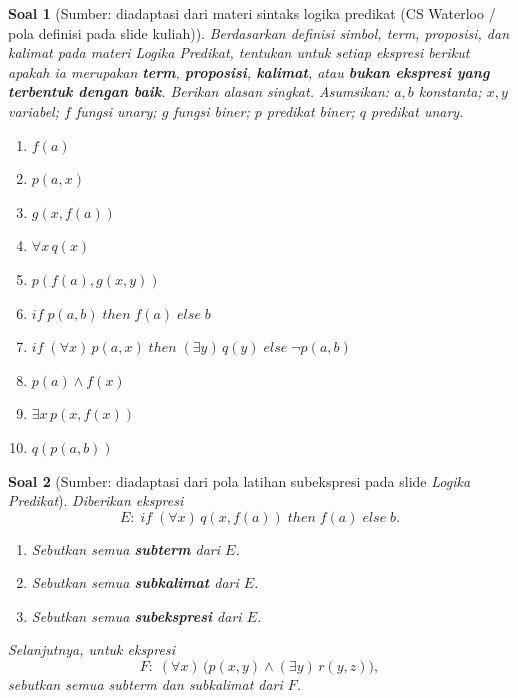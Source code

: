 \documentclass[12pt,a4paper]{article}
\theoremstyle{soaljarak}
\newtheorem{soal}{Soal}
\begin{document}
\begin{soal}[\normalfont Sumber: diadaptasi dari materi sintaks logika predikat (CS Waterloo / pola definisi pada slide kuliah)]
  Berdasarkan definisi simbol, term, proposisi, dan kalimat pada materi \textit{Logika Predikat}, tentukan untuk setiap ekspresi berikut apakah ia merupakan \textbf{term}, \textbf{proposisi}, \textbf{kalimat}, atau \textbf{bukan ekspresi yang terbentuk dengan baik}.
  Berikan alasan singkat.
  Asumsikan: \(a,b\) konstanta; \(x,y\) variabel; \(f\) fungsi unary; \(g\) fungsi biner; \(p\) predikat biner; \(q\) predikat unary.
  \begin{enumerate}
    \item \(f(a)\)
    \item \(p(a,x)\)
    \item \(g(x,f(a))\)
    \item \(\forall x\,q(x)\)
    \item \(p(f(a), g(x,y))\)
    \item \(\mathit{if}\; p(a,b)\; \mathit{then}\; f(a)\; \mathit{else}\; b\)
    \item \(\mathit{if}\; (\forall x)\,p(a,x)\; \mathit{then}\; (\exists y)\,q(y)\; \mathit{else}\; \neg p(a,b)\)
    \item \(p(a) \wedge f(x)\)
    \item \(\exists x\,p(x, f(x))\)
    \item \(q(p(a,b))\)
  \end{enumerate}
\end{soal}

\begin{soal}[\normalfont Sumber: diadaptasi dari pola latihan subekspresi pada slide \textit{Logika Predikat}]
  Diberikan ekspresi
  \[
  E :\;
  \mathit{if}\; (\forall x)\,q(x, f(a))\;
  \mathit{then}\; f(a)\;
  \mathit{else}\; b.
  \]
  \begin{enumerate}
    \item Sebutkan semua \textbf{subterm} dari \(E\).
    \item Sebutkan semua \textbf{subkalimat} dari \(E\).
    \item Sebutkan semua \textbf{subekspresi} dari \(E\).
  \end{enumerate}
  Selanjutnya, untuk ekspresi
  \[
  F :\;
  (\forall x)\,\bigl(p(x,y) \wedge (\exists y)\,r(y,z)\bigr),
  \]
  sebutkan semua subterm dan subkalimat dari \(F\).
\end{soal}
\end{document}
